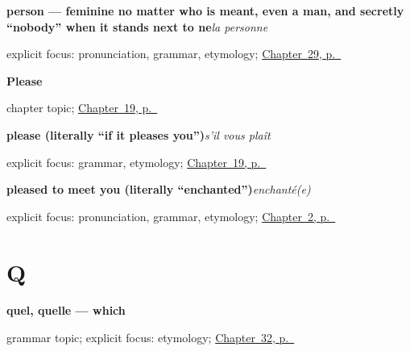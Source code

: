 \noindent\begin{minipage}[t]{\linewidth}
\raggedright
\textbf{person — feminine no matter who is meant, even a man, and secretly \textquotedblleft{}nobody\textquotedblright{} when it stands next to ne}\enspace\emph{la personne}\par
\footnotesize explicit focus: pronunciation, grammar, etymology; \hyperref[ch:fr-the-people-you-introduce]{Chapter~29, p.~\pageref*{ch:fr-the-people-you-introduce}}
\end{minipage}\par\smallskip

\noindent\begin{minipage}[t]{\linewidth}
\raggedright
\textbf{Please}\par
\footnotesize chapter topic; \hyperref[ch:fr-please]{Chapter~19, p.~\pageref*{ch:fr-please}}
\end{minipage}\par\smallskip

\noindent\begin{minipage}[t]{\linewidth}
\raggedright
\textbf{please (literally \textquotedblleft{}if it pleases you\textquotedblright{})}\enspace\emph{s'il vous plaît}\par
\footnotesize explicit focus: grammar, etymology; \hyperref[ch:fr-please]{Chapter~19, p.~\pageref*{ch:fr-please}}
\end{minipage}\par\smallskip

\noindent\begin{minipage}[t]{\linewidth}
\raggedright
\textbf{pleased to meet you (literally \textquotedblleft{}enchanted\textquotedblright{})}\enspace\emph{enchanté(e)}\par
\footnotesize explicit focus: pronunciation, grammar, etymology; \hyperref[ch:introductions]{Chapter~2, p.~\pageref*{ch:introductions}}
\end{minipage}\par\smallskip

\section*{Q}

\noindent\begin{minipage}[t]{\linewidth}
\raggedright
\textbf{quel, quelle — which}\par
\footnotesize grammar topic; explicit focus: etymology; \hyperref[ch:fr-questions]{Chapter~32, p.~\pageref*{ch:fr-questions}}
\end{minipage}\par\smallskip

